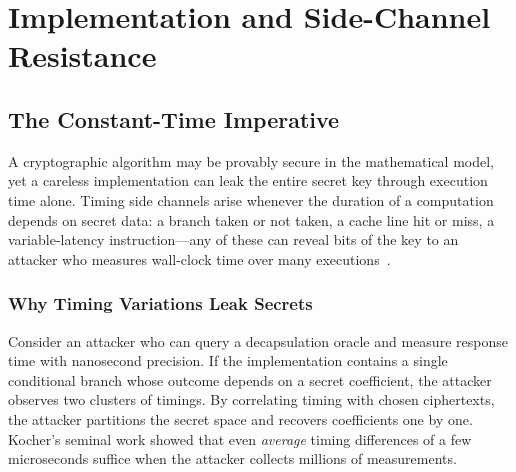 \chapter{Implementation and Side-Channel Resistance}
\label{ch:implementation}





\section{The Constant-Time Imperative}
\label{sec:constant-time}

A cryptographic algorithm may be provably secure in the mathematical model, yet a careless implementation can leak the entire secret key through execution time alone.  Timing side channels arise whenever the duration of a computation depends on secret data: a branch taken or not taken, a cache line hit or miss, a variable-latency instruction---any of these can reveal bits of the key to an attacker who measures wall-clock time over many executions~\cite{FIPS203}.

\subsection{Why Timing Variations Leak Secrets}
\label{subsec:timing-leak}

Consider an attacker who can query a decapsulation oracle and measure response time with nanosecond precision.  If the implementation contains a single conditional branch whose outcome depends on a secret coefficient, the attacker observes two clusters of timings.  By correlating timing with chosen ciphertexts, the attacker partitions the secret space and recovers coefficients one by one.  Kocher's seminal work showed that even \emph{average} timing differences of a few microseconds suffice when the attacker collects millions of measurements.

